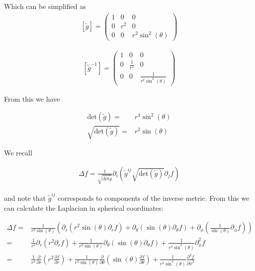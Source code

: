 \documentclass[12pt]{article}
\begin{document}
Which can be simplified as
\begin{align}
\left[\tilde{g}\right] = \begin{pmatrix}
1 & 0 & 0\\
0 & r^2 & 0\\
0 & 0 & r^2 \sin^2(\theta) 
\end{pmatrix}
\end{align}

\begin{align}
\left[\tilde{g}^{-1}\right] = \begin{pmatrix}
1 & 0 & 0\\
0 & \frac{1}{r^2} & 0\\
0 & 0 & \frac{1}{r^2 \sin^2(\theta)}
\end{pmatrix}
\end{align}

From this we have

\begin{align}
\text{det}(\tilde{g}) =& r^4 \sin^2(\theta)\\
\sqrt{\text{det}(\tilde{g})} =& r^2 \sin(\theta)
\end{align}

We recall

\begin{align}
\Delta f = \frac{1}{\sqrt{\text{det}{\tilde{g}}}} \partial_i\left(\tilde{g}^{ij} \sqrt{\text{det}(\tilde{g})} \partial_j f\right)
\end{align}

and note that $\tilde{g}^{ij}$ corresponds to components of the inverse metric.
From this we can calculate the Laplacian in spherical coordinates:

\begin{align}
\Delta f =& \frac{1}{r^2 \sin(\theta)}\left(\partial_r\left(r^2\sin(\theta) \partial_r f\right) + \partial_{\theta}\left(\sin(\theta) \partial_{\theta} f\right) + \partial_{\phi}\left(\frac{1}{\sin(\theta)}\partial_{\phi} f \right)\right)\\
=& \frac{1}{r^2} \partial_r (r^2 \partial_r f) + \frac{1}{r^2 \sin(\theta)} \partial_{\theta}(\sin(\theta) \partial_{\theta} f) + \frac{1}{r^2\sin^2(\theta)} \partial_{\phi}^2 f\\
=& \frac{1}{r^2} \frac{\partial}{\partial r}\left(r^2 \frac{\partial f}{\partial r}\right) + \frac{1}{r^2\sin(\theta)} \frac{\partial}{\partial \theta}\left(\sin(\theta) \frac{\partial f}{\partial \theta}\right) + \frac{1}{r^2 \sin^2(\theta)}\frac{\partial^2 f}{\partial \phi^2}
\end{align}
\end{document}
